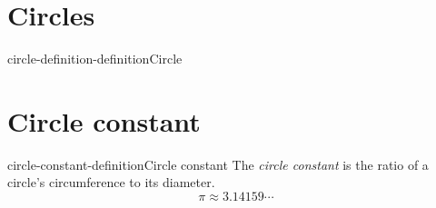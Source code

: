 \documentclass[preview]{standalone}
\begin{document}
\genpage

\section{Circles}

\begin{snippetdefinition}{circle-definition-definition}{Circle}
    \todo
\end{snippetdefinition}

\section{Circle constant}

\begin{snippetdefinition}{circle-constant-definition}{Circle constant}
    The \textit{circle constant} is the ratio of a circle's circumference
    to its diameter.
    \[
        \pi \approx 3.14159\cdots
    \]
\end{snippetdefinition}
\end{document}
